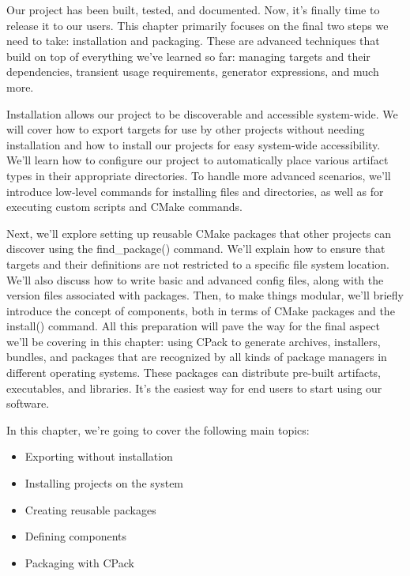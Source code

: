Our project has been built, tested, and documented. Now, it’s finally time to release it to our users. This chapter primarily focuses on the final two steps we need to take: installation and packaging. These are advanced techniques that build on top of everything we’ve learned so far: managing targets and their dependencies, transient usage requirements, generator expressions, and much more.

Installation allows our project to be discoverable and accessible system-wide. We will cover how to export targets for use by other projects without needing installation and how to install our projects for easy system-wide accessibility. We’ll learn how to configure our project to automatically place various artifact types in their appropriate directories. To handle more advanced scenarios, we’ll introduce low-level commands for installing files and directories, as well as for executing custom scripts and CMake commands.

Next, we’ll explore setting up reusable CMake packages that other projects can discover using the find\_package() command. We’ll explain how to ensure that targets and their definitions are not restricted to a specific file system location. We’ll also discuss how to write basic and advanced config files, along with the version files associated with packages. Then, to make things modular, we’ll briefly introduce the concept of components, both in terms of CMake packages and the install() command. All this preparation will pave the way for the final aspect we’ll be covering in this chapter: using CPack to generate archives, installers, bundles, and packages that are recognized by all kinds of package managers in different operating systems. These packages can distribute pre-built artifacts, executables, and libraries. It’s the easiest way for end users to start using our software.

In this chapter, we’re going to cover the following main topics:

\begin{itemize}
\item
Exporting without installation

\item
Installing projects on the system

\item
Creating reusable packages

\item
Defining components

\item
Packaging with CPack
\end{itemize}








